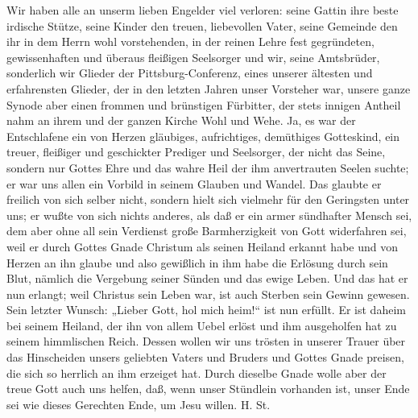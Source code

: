 Wir haben alle an unserm lieben Engelder viel verloren: seine Gattin ihre beste irdische Stütze, seine Kinder den treuen, liebevollen Vater, seine Gemeinde den ihr in dem Herrn wohl vorstehenden, in der reinen Lehre fest gegründeten, gewissenhaften und überaus fleißigen Seelsorger und wir, seine Amtsbrüder, sonderlich wir Glieder der Pittsburg-Conferenz, eines unserer ältesten und erfahrensten Glieder, der in den letzten Jahren unser Vorsteher war, unsere ganze Synode aber einen frommen und brünstigen Fürbitter, der stets innigen Antheil nahm an ihrem und der ganzen Kirche Wohl und Wehe. Ja, es war der Entschlafene ein von Herzen gläubiges, aufrichtiges, demüthiges Gotteskind, ein treuer, fleißiger und geschickter Prediger und Seelsorger, der nicht das Seine, sondern nur Gottes Ehre und das wahre Heil der ihm anvertrauten Seelen suchte; er war uns allen ein Vorbild in seinem Glauben und Wandel. Das glaubte er freilich von sich selber nicht, sondern hielt sich vielmehr für den Geringsten unter uns; er wußte von sich nichts anderes, als daß er ein armer sündhafter Mensch sei, dem aber ohne all sein Verdienst große Barmherzigkeit von Gott widerfahren sei, weil er durch Gottes Gnade Christum als seinen Heiland erkannt habe und von Herzen an ihn glaube und also gewißlich in ihm habe die Erlösung durch sein Blut, nämlich die Vergebung seiner Sünden und das ewige Leben. Und das hat er nun erlangt; weil Christus sein Leben war, ist auch Sterben sein Gewinn gewesen. Sein letzter Wunsch: „Lieber Gott, hol mich heim!“ ist nun erfüllt. Er ist daheim bei seinem Heiland, der ihn von allem Uebel erlöst und ihm ausgeholfen hat zu seinem himmlischen Reich. Dessen wollen wir uns trösten in unserer Trauer über das Hinscheiden unsers geliebten Vaters und Bruders und Gottes Gnade preisen, die sich so herrlich an ihm erzeiget hat. Durch dieselbe Gnade wolle aber der treue Gott auch uns helfen, daß, wenn unser Stündlein vorhanden ist, unser Ende sei wie dieses Gerechten Ende, um Jesu willen. H. St.
